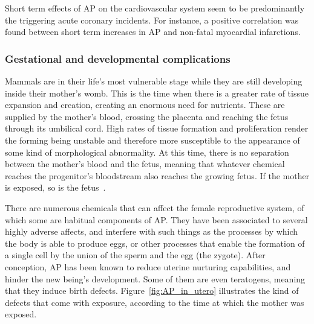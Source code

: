 Short term effects of \gls{AP} on the cardiovascular system seem to be
predominantly the triggering acute coronary incidents. For instance, a
positive correlation was found between short term increases in \gls{AP}
and non-fatal myocardial infarctions.

\subsubsection{Gestational and developmental complications}%
\label{ssub:gestational_and_developmental_complications}

Mammals are in their life's most vulnerable stage while they are still
developing inside their mother's womb. This is the time when there is a
greater rate of tissue expansion and creation, creating an enormous need
for nutrients. These are supplied by the mother's blood, crossing the
placenta and reaching the fetus through its umbilical cord. High rates
of tissue formation and proliferation render the forming being unstable
and therefore more susceptible to the appearance of some kind of
morphological abnormality. At this time, there is no separation between
the mother's blood and the fetus, meaning that whatever chemical reaches
the progenitor's bloodstream also reaches the growing fetus. If the
mother is exposed, so is the fetus~\cite{Vallero2014}.

There are numerous chemicals that can affect the female reproductive
system, of which some are habitual components of \gls{AP}. They have
been associated to several highly adverse affects, and interfere with
such things as the processes by which the body is able to produce eggs,
or other processes that enable the formation of a single cell by the
union of the sperm and the egg (the zygote). After conception, \gls{AP}
has been known to reduce uterine nurturing capabilities, and hinder the
new being's development. Some of them are even teratogens, meaning that
they induce birth defects. Figure~\ref{fig:AP_in_utero} illustrates the
kind of defects that come with exposure, according to the time at which
the mother was exposed.

